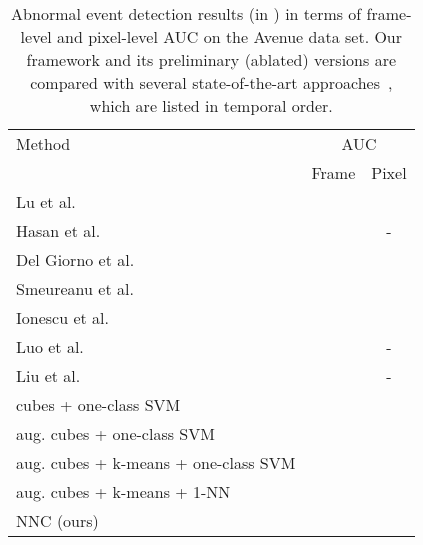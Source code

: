\documentclass[10pt,twocolumn,letterpaper]{article}
\begin{document}
\begin{table}[t]
\small{
\begin{center}
\begin{tabular}{|l|c|c|}
\hline
Method 																& \multicolumn{2}{|c|}{AUC} \\
\cline{2-3}
			 																& Frame  		& Pixel\\
\hline
\hline
Lu et al.~\cite{Lu-ICCV-2013}								& 			&  \\
Hasan et al.~\cite{Hasan-CVPR-2016}					& 			& -			\\
Del Giorno et al.~\cite{Giorno-ECCV-2016}			& 			&  \\
Smeureanu et al.~\cite{Smeureanu-ICIAP-2017}	& 			&  \\
Ionescu et al.~\cite{Ionescu-ICCV-2017}				& 			&  \\
Luo et al.~\cite{Luo-ICCV-2017}							& 			& - 			\\
Liu et al.~\cite{Liu-CVPR-2018}								& 			& - 			\\
\hline
cubes + one-class SVM  										& 			&  \\
aug. cubes + one-class SVM 								& 			&  \\
aug. cubes + k-means + one-class SVM 				& 			&  \\
aug. cubes + k-means + 1-NN								& 			&  \\
\hline
NNC (ours)															& 			&  \\
\hline
\end{tabular}
\end{center}
\vspace*{-0.1cm}
\caption{Abnormal event detection results (in ) in terms of frame-level and pixel-level AUC on the Avenue data set. Our framework and its preliminary (ablated) versions are compared with several state-of-the-art approaches~\cite{Giorno-ECCV-2016,Hasan-CVPR-2016,Ionescu-ICCV-2017,Liu-CVPR-2018,Lu-ICCV-2013,Luo-ICCV-2017,Smeureanu-ICIAP-2017}, which are listed in temporal order.\label{tab_Avenue}}
}
\vspace*{-0.3cm}
\end{table}
\end{document}
